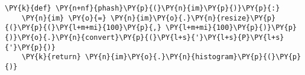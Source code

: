 \begin{Verbatim}[commandchars=\\\{\}]
\PY{k}{def} \PY{n+nf}{phash}\PY{p}{(}\PY{n}{im}\PY{p}{)}\PY{p}{:}
    \PY{n}{im} \PY{o}{=} \PY{n}{im}\PY{o}{.}\PY{n}{resize}\PY{p}{(}\PY{p}{(}\PY{l+m+mi}{100}\PY{p}{,} \PY{l+m+mi}{100}\PY{p}{)}\PY{p}{)}\PY{o}{.}\PY{n}{convert}\PY{p}{(}\PY{l+s}{'}\PY{l+s}{P}\PY{l+s}{'}\PY{p}{)}
    \PY{k}{return} \PY{n}{im}\PY{o}{.}\PY{n}{histogram}\PY{p}{(}\PY{p}{)}
\end{Verbatim}
